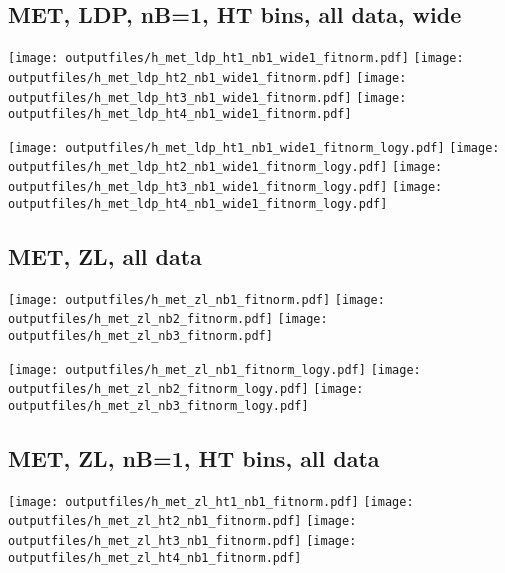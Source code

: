 \documentclass[11pt]{article}
\begin{document}
     \subsection{ MET, LDP, nB=1, HT bins, all data, wide}

    \noindent
     \texttt{[image: outputfiles/h\_met\_ldp\_ht1\_nb1\_wide1\_fitnorm.pdf]}
     \texttt{[image: outputfiles/h\_met\_ldp\_ht2\_nb1\_wide1\_fitnorm.pdf]}
     \texttt{[image: outputfiles/h\_met\_ldp\_ht3\_nb1\_wide1\_fitnorm.pdf]}
     \texttt{[image: outputfiles/h\_met\_ldp\_ht4\_nb1\_wide1\_fitnorm.pdf]}

    \noindent
     \texttt{[image: outputfiles/h\_met\_ldp\_ht1\_nb1\_wide1\_fitnorm\_logy.pdf]}
     \texttt{[image: outputfiles/h\_met\_ldp\_ht2\_nb1\_wide1\_fitnorm\_logy.pdf]}
     \texttt{[image: outputfiles/h\_met\_ldp\_ht3\_nb1\_wide1\_fitnorm\_logy.pdf]}
     \texttt{[image: outputfiles/h\_met\_ldp\_ht4\_nb1\_wide1\_fitnorm\_logy.pdf]}




     \subsection{ MET, ZL, all data}

    \noindent
     \texttt{[image: outputfiles/h\_met\_zl\_nb1\_fitnorm.pdf]}
     \texttt{[image: outputfiles/h\_met\_zl\_nb2\_fitnorm.pdf]}
     \texttt{[image: outputfiles/h\_met\_zl\_nb3\_fitnorm.pdf]}

    \noindent
     \texttt{[image: outputfiles/h\_met\_zl\_nb1\_fitnorm\_logy.pdf]}
     \texttt{[image: outputfiles/h\_met\_zl\_nb2\_fitnorm\_logy.pdf]}
     \texttt{[image: outputfiles/h\_met\_zl\_nb3\_fitnorm\_logy.pdf]}








     \subsection{ MET, ZL, nB=1, HT bins, all data}

    \noindent
     \texttt{[image: outputfiles/h\_met\_zl\_ht1\_nb1\_fitnorm.pdf]}
     \texttt{[image: outputfiles/h\_met\_zl\_ht2\_nb1\_fitnorm.pdf]}
     \texttt{[image: outputfiles/h\_met\_zl\_ht3\_nb1\_fitnorm.pdf]}
     \texttt{[image: outputfiles/h\_met\_zl\_ht4\_nb1\_fitnorm.pdf]}
\end{document}
